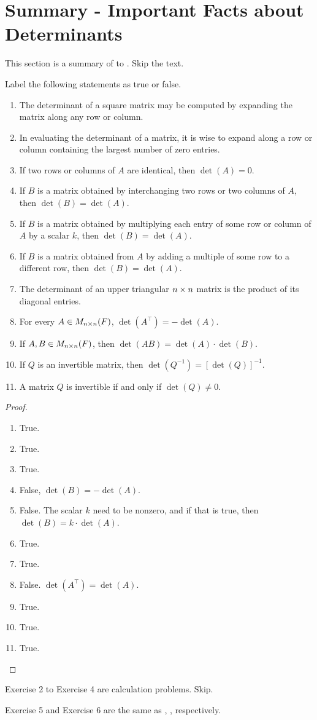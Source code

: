 \section{Summary - Important Facts about Determinants} \label{sec 4.4}

This section is a summary of  to .
Skip the text.

\exercisesection

\begin{exercise} \label{exercise 4.4.1}
Label the following statements as true or false.
\begin{enumerate}
\item The determinant of a square matrix may be computed by expanding the matrix along any row or column.
\item In evaluating the determinant of a matrix, it is wise to expand along a row or column containing the largest number of zero entries.
\item If two rows or columns of \(A\) are identical, then \(\det(A) = 0\).
\item If \(B\) is a matrix obtained by interchanging two rows or two columns of \(A\), then \(\det(B) = \det(A)\).
\item If \(B\) is a matrix obtained by multiplying each entry of some row or column of \(A\) by a scalar \(k\), then \(\det(B) = \det(A)\).
\item If \(B\) is a matrix obtained from \(A\) by adding a multiple of some row to a different row, then \(\det(B) = \det(A)\).
\item The determinant of an upper triangular \(n \times n\) matrix is the product of its diagonal entries.
\item For every \(A \in M_{n \times n}(F)\), \(\det(A^\top) = -\det(A)\).
\item If \(A, B \in M_{n \times n}(F)\), then \(\det(AB) = \det(A) \cdot \det(B)\).
\item If \(Q\) is an invertible matrix, then \(\det(Q^{-1}) = [\det(Q)]^{-1}\).
\item A matrix \(Q\) is invertible if and only if \(\det(Q) \ne 0\).
\end{enumerate}
\end{exercise}

\begin{proof} \ 

\begin{enumerate}
\item True.
\item True.
\item True.
\item False, \(\det(B) = -\det(A)\).
\item False. The scalar \(k\) need to be nonzero, and if that is true, then \(\det(B) = k \cdot \det(A)\).
\item True.
\item True.
\item False. \(\det(A^\top) = \det(A)\).
\item True.
\item True.
\item True.
\end{enumerate}
\end{proof}

Exercise 2 to Exercise 4 are calculation problems. Skip.

Exercise 5 and Exercise 6 are the same as , , respectively.